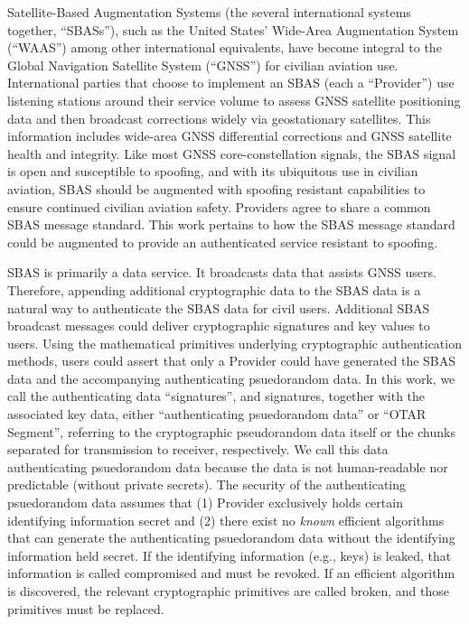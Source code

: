 \documentclass[letterpaper,times]{IONconf/IONconf}
\begin{document}
	Satellite-Based Augmentation Systems (the several international systems together, ``SBASs''), such as the United States' Wide-Area Augmentation System (``WAAS'') among other international equivalents, have become integral to the Global Navigation Satellite System (``GNSS'') for civilian aviation use.
	International parties that choose to implement an SBAS (each a ``Provider'') use listening stations around their service volume to assess GNSS satellite positioning data and then broadcast corrections widely via geostationary satellites.
	This information includes wide-area GNSS differential corrections and GNSS satellite health and integrity.
	Like most GNSS core-constellation signals, the SBAS signal is open and susceptible to spoofing, and with its ubiquitous use in civilian aviation, SBAS should be augmented with spoofing resistant capabilities to ensure continued civilian aviation safety.
	Providers agree to share a common SBAS message standard.
	This work pertains to how the SBAS message standard could be augmented to provide an authenticated service resistant to spoofing.

	SBAS is primarily a data service.
	It broadcasts data that assists GNSS users.
	Therefore, appending additional cryptographic data to the SBAS data is a natural way to authenticate the SBAS data for civil users.
	Additional SBAS broadcast messages could deliver cryptographic signatures and key values to users.
	Using the mathematical primitives underlying cryptographic authentication methods, users could assert that only a Provider could have generated the SBAS data and the accompanying authenticating psuedorandom data.
	In this work, we call the authenticating data ``signatures'', and signatures, together with the associated key data, either ``authenticating psuedorandom data'' or ``OTAR Segment'', referring to the cryptographic pseudorandom data itself or the chunks separated for transmission to receiver, respectively.
	We call this data authenticating psuedorandom data because the data is not human-readable nor predictable (without private secrets).
	The security of the authenticating psuedorandom data assumes that (1) Provider exclusively holds certain identifying information secret and (2) there exist no {\em known} efficient algorithms that can generate the authenticating psuedorandom data without the identifying information held secret.
	If the identifying information (e.g., keys) is leaked, that information is called compromised and must be revoked.
	If an efficient algorithm is discovered, the relevant cryptographic primitives are called broken, and those primitives must be replaced.
\end{document}
